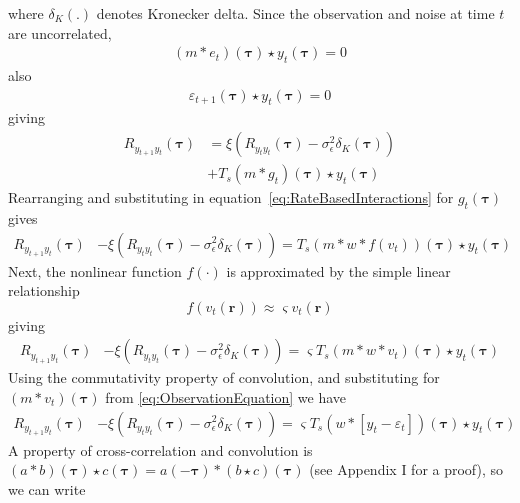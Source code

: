 \documentclass[]{article}
\newcommand{\parham}[1]{\textsf{\emph{\textbf{\textcolor{blue}{#1}}}}}
\begin{document}
where $\delta_{K}\left(.\right)$ denotes Kronecker delta. Since the observation and noise at time $t$ are uncorrelated,
\begin{align}
(m\ast  e_t)(\boldsymbol\tau) \star y_t(\boldsymbol\tau)=0
\end{align}
also
\begin{align}
 \varepsilon_{t+1}(\boldsymbol\tau) \star y_t(\boldsymbol\tau)=0
\end{align}
giving 
\begin{align}
	R_{y_{t+1}y_t}(\boldsymbol{\tau}) &= \xi \left(R_{y_ty_t}(\boldsymbol{\tau})-\sigma_{\epsilon}^2  \delta_{K}\left(\boldsymbol\tau\right)\right)\nonumber \\
	&+ T_s(m\ast g_t)(\boldsymbol\tau) \star y_t(\boldsymbol\tau)
\end{align}
Rearranging and substituting in equation~\ref{eq:RateBasedInteractions} for $g_t(\boldsymbol\tau)$ gives
\begin{align}
	R_{y_{t+1}y_t}(\boldsymbol{\tau}) &-\xi \left(R_{y_ty_t}(\boldsymbol{\tau})-\sigma_{\epsilon}^2  \delta_{K}\left(\boldsymbol\tau\right)\right) =  T_s(m\ast w*f(v_t))(\boldsymbol\tau) \star y_t(\boldsymbol\tau)
\end{align}  
Next, the nonlinear function $f(\cdot)$ is approximated by the simple linear relationship
\begin{equation}
	f\left(v_t(\mathbf{r})\right) \approx \varsigma v_t(\mathbf{r})
\end{equation} 
giving
\begin{align}
	R_{y_{t+1}y_t}(\boldsymbol{\tau}) &-\xi \left(R_{y_ty_t}(\boldsymbol{\tau})-\sigma_{\epsilon}^2  \delta_{K}\left(\boldsymbol\tau\right)\right) = \varsigma T_s (m\ast w\ast v_t)(\boldsymbol\tau)\star y_t(\boldsymbol\tau)
\end{align} 
Using the commutativity property of convolution, and substituting for $(m\ast v_t)(\boldsymbol\tau)$ from \ref{eq:ObservationEquation} we have
\begin{align}
	R_{y_{t+1}y_t}(\boldsymbol{\tau})&-\xi \left(R_{y_ty_t}(\boldsymbol{\tau})-\sigma_{\epsilon}^2  \delta_{K}\left(\boldsymbol\tau\right)\right) =  \varsigma T_s \left( w\ast \left[y_t-\varepsilon_t \right]\right)(\boldsymbol\tau) \star y_t(\boldsymbol\tau)
\end{align}
A property of cross-correlation and convolution is $(a \ast b)(\boldsymbol\tau) \star c(\boldsymbol\tau) = a(-\boldsymbol\tau)\ast(b \star c)(\boldsymbol\tau)$ (see Appendix I for a proof), so we can write
\end{document}

